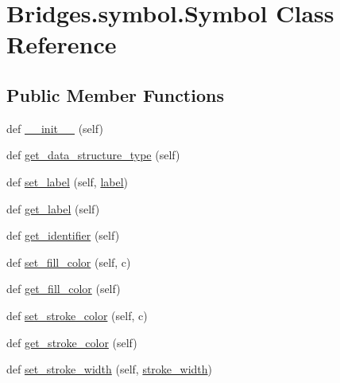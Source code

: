 \hypertarget{class_bridges_1_1symbol_1_1_symbol}{}\section{Bridges.\+symbol.\+Symbol Class Reference}
\label{class_bridges_1_1symbol_1_1_symbol}
\subsection*{Public Member Functions}
\begin{DoxyCompactItemize}
\item 
def \mbox{\hyperlink{class_bridges_1_1symbol_1_1_symbol_a992996d7f32baa51d1d79ef490a7f118}{\+\_\+\+\_\+init\+\_\+\+\_\+}} (self)
\item 
def \mbox{\hyperlink{class_bridges_1_1symbol_1_1_symbol_a75616da83e9f055698ad80f1dee77923}{get\+\_\+data\+\_\+structure\+\_\+type}} (self)
\item 
def \mbox{\hyperlink{class_bridges_1_1symbol_1_1_symbol_a812f6db48ba2d262ffad425081b4244f}{set\+\_\+label}} (self, \mbox{\hyperlink{class_bridges_1_1symbol_1_1_symbol_a271c2a9ba1b41c143af4192bfaf02ff4}{label}})
\item 
def \mbox{\hyperlink{class_bridges_1_1symbol_1_1_symbol_aa52a3204f4374f7ebdd9b7b027188b6b}{get\+\_\+label}} (self)
\item 
def \mbox{\hyperlink{class_bridges_1_1symbol_1_1_symbol_af8ebaf843878b84d0429042afd01d6c5}{get\+\_\+identifier}} (self)
\item 
def \mbox{\hyperlink{class_bridges_1_1symbol_1_1_symbol_a1398e836a3ff8950d98b4c6c8011c1c0}{set\+\_\+fill\+\_\+color}} (self, c)
\item 
def \mbox{\hyperlink{class_bridges_1_1symbol_1_1_symbol_a65c9e7f4784182e5359688700771a091}{get\+\_\+fill\+\_\+color}} (self)
\item 
def \mbox{\hyperlink{class_bridges_1_1symbol_1_1_symbol_a395a8591b086f4c4280333525296d28f}{set\+\_\+stroke\+\_\+color}} (self, c)
\item 
def \mbox{\hyperlink{class_bridges_1_1symbol_1_1_symbol_a494fa3ba09a9b01947ad877c64b1b7a7}{get\+\_\+stroke\+\_\+color}} (self)
\item 
def \mbox{\hyperlink{class_bridges_1_1symbol_1_1_symbol_affe02f71ce09ab7684b574414b89ddb8}{set\+\_\+stroke\+\_\+width}} (self, \mbox{\hyperlink{class_bridges_1_1symbol_1_1_symbol_a44ba84d33800816e0f2696739673190e}{stroke\+\_\+width}})
\item 

\end{DoxyCompactItemize}
